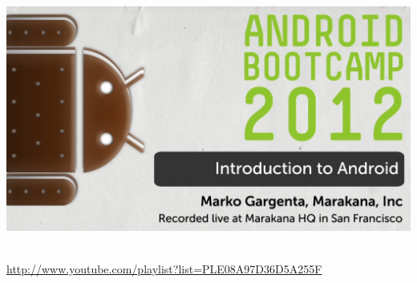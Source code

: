 \documentclass[a4paper,slides=slides,handouts=handouts]{mh-presentation}       %
\begin{document}
	\begin{slide}
		

		\includegraphics[scale=.14]{marakanabootcamp.png}$\ $
		
		\vspace{5mm}
		
		{\small\url{http://www.youtube.com/playlist?list=PLE08A97D36D5A255F}}
	\end{slide}
	
\end{document}
